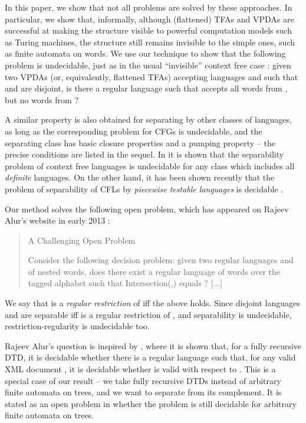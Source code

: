\documentclass{article}
\begin{document}
In this paper, we show that not all problems are solved by these approaches. In
particular, we show that, informally,
although (flattened) TFAs and VPDAs are successful at making
the structure visible to powerful computation models such as
Turing machines, the structure still remains invisible to the simple
ones, such as finite automata on words. We use our technique to show that the following
problem is undecidable, just as in the usual ``invisible'' context free case
\cite{hunt, szymanski}:
given two VPDAs (or, equivalently, flattened TFAs) accepting languages  and 
such that  and  are disjoint, is there a regular language  such that
 accepts all words from , but no words from ?

A similar property
is also obtained for separating by other classes of languages, as long as the
corresponding problem for CFGs is undecidable, and the separating class has basic
closure properties and a pumping property -- the precise conditions are listed in the
sequel.
In \cite{hunt} it is shown that the separability problem of
context free languages is undecidable for any class which includes all
{\it definite} languages. On the other hand, 
it has been shown recently that the problem of separability of CFLs by
\emph{piecewise testable languages} is decidable \cite{wojtekczerwinski}.

Our method solves the following open problem, 
which has appeared on Rajeev Alur's website in early 2013 \cite{alur2013}:

\begin{quote}
A Challenging Open Problem

Consider the following decision problem: given two regular languages  and  of nested
words, does there exist a regular language  of words over the tagged alphabet such that
Intersection(,) equals ? [...]\end{quote}

We say that  is a \emph{regular restriction} of 
iff the above holds.
Since disjoint languages  and  are separable iff  is a regular
restriction of , and separability is undecidable,
restriction-regularity is undecidable too.

Rajeev Alur's question is inspired by \cite{streaming-pods}, where
it is shown that, for a fully recursive DTD, it is decidable whether
there is a regular language  such that, for any valid XML document ,
it is decidable whether  is valid with respect to . This is a special case
of our result -- we take fully recursive DTDs instead of arbitrary finite automata
on trees, and we want to separate  from its complement. It is stated as an open
problem in \cite{streaming-pods} whether the problem is still decidable for arbitrary
finite automata on trees.
\end{document}
